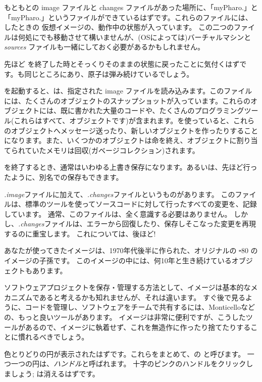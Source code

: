 \documentclass[a4paper,10pt,twoside]{book}
\begin{document}
もともとの image ファイルと changes ファイルがあった場所に、「myPharo.」と「myPharo.」というファイルができているはずです。これらのファイルには、したときの \pharo 仮想イメージの、動作中の状態が入っています。
この二つのファイルは何処にでも移動させて構いませんが、(OSによっては)バーチャルマシンと \emph{sources} ファイルも一緒にしておく必要があるかもしれません。


先ほど \pharo を終了した時とそっくりそのままの状態に戻ったことに気付くはずです。\bam も同じところにあり、原子は弾み続けているでしょう。

\pharo を起動すると、\pharo {}は、指定された image ファイルを読み込みます。このファイルには、たくさんのオブジェクトのスナップショットが入っています。これらのオブジェクトには、既に書かれた大量のコードや、たくさんのプログラミングツール(これらはすべて、オブジェクトです)が含まれます。\pharo を使っていると、これらのオブジェクトへメッセージ送ったり、新しいオブジェクトを作ったりすることになります。また、いくつかのオブジェクトは命を終え、オブジェクトに割り当てられていたメモリは回収(\ie ガベージコレクション)されます。

\pharo を終了するとき、通常はいわゆる上書き保存になります。あるいは、先ほど行ったように、別名での保存もできます。

\emph{.image}ファイルに加えて、\emph{.changes}ファイルというものがあります。
このファイルは、標準のツールを使ってソースコードに対して行ったすべての変更を、記録しています。
通常、このファイルは、全く意識する必要はありません。
しかし、\emph{.changes}ファイルは、エラーから回復したり、保存しそこなった変更を再現するのに重宝します。
これについては、後ほど!

あなたが使ってきたイメージは、1970年代後半に作られた、オリジナルの \st-80 のイメージの子孫です。
このイメージの中には、何10年と生き続けているオブジェクトもあります。

ソフトウェアプロジェクトを保存・管理する方法として、イメージは基本的なメカニズムであると考えるかも知れませんが、それは違います。
すぐ後で見るように、コードを管理し、ソフトウェアをチームで共有するには、Monticelloなどの、もっと良いツールがあります。
イメージは非常に便利ですが、こうしたツールがあるので、イメージに執着せず、これを無造作に作ったり捨てたりすることに慣れるべきでしょう。

色とりどりの円が表示されたはずです。これらをまとめて、\bam の と呼びます。
一つ一つの円は、\emph{ハンドル}と呼ばれます。
十字のピンクのハンドルをクリックしましょう; \bam は消えるはずです。
\end{document}
